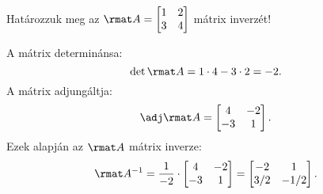 \documentclass[a4paper, 12pt]{scrartcl}
\begin{document}
\begin{example}
  Határozzuk meg az $\rmat A = \begin{bmatrix}
      1 & 2 \\
      3 & 4
    \end{bmatrix}$ mátrix inverzét!

  A mátrix determinánsa:
  $$
    \det \rmat A = 1 \cdot 4 - 3 \cdot 2 = -2
    \text.
  $$
  A mátrix adjungáltja:
  $$
    \adj \rmat A = \begin{bmatrix}
      4  & -2 \\
      -3 & 1
    \end{bmatrix}
    \text.
  $$
  Ezek alapján az $\rmat A$ mátrix inverze:
  $$
    \rmat A^{-1} = \frac{1}{-2} \cdot \begin{bmatrix}
      4  & -2 \\
      -3 & 1
    \end{bmatrix}
    = \begin{bmatrix}
      -2  & 1    \\
      3/2 & -1/2
    \end{bmatrix}
    \text.
  $$
\end{example}
\end{document}
